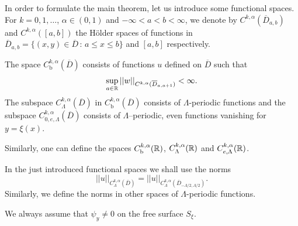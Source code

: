 \documentclass[a4paper,reqno,12pt]{amsart}
\theoremstyle{plain}
\theoremstyle{definition}
\numberwithin{equation}{section}
\begin{document}
In order to formulate the main theorem, let us introduce some functional spaces.
For $k=0,1,\ldots$, $\alpha\in(0,1)$ and $-\infty<a<b<\infty$,
we denote by $C^{k,\alpha}(\overline{D}_{a,b})$ and $C^{k,\alpha}([a,b])$
the H\"older spaces of functions in $\overline{D}_{a,b}=\{(x,y)\in \overline{D}
\,:\,a\leq x\leq b\}$ and $[a,b]$ respectively.



The space $C^{k,\alpha}_{\textrm{b}}(\overline{D})$ consists of functions
$u$ defined on $\overline{D}$
such that
$$
\sup_{a\in \Bbb R}||w||_{C^{k,\alpha}(\overline{D}_{a,a+1})}<\infty.
$$
 The subspace   $C^{k,\alpha}_{\Lambda}(\overline{D})$ in $C^{k,\alpha}_{\textrm{b}}(\overline{D})$
consists of $\Lambda$-periodic functions and the subspace $C^{k,\alpha}_{0,e,\Lambda}(\overline{D})$ consists of   $\Lambda$--periodic, even functions vanishing for $y=\xi(x)$.



Similarly, one can define the spaces $C^{k,\alpha}_{\textrm{b}}(\Bbb R)$,
$C^{k,\alpha}_{\Lambda}(\Bbb R)$ and
$C^{k,\alpha}_{e,\Lambda}(\Bbb R)$.

In the just introduced functional spaces we shall use the norms
$$
||u||_{C^{k,\alpha}_{\Lambda}(\overline{D})}=
||u||_{C^{k,\alpha}_{\Lambda}(\overline{D}_{-\Lambda/2,\Lambda/2})}.
$$
Similarly, we define the norms in other spaces of $\Lambda$-periodic functions.

We always assume that $\psi_y\neq 0$ on the free surface $S_\xi$.
\end{document}
